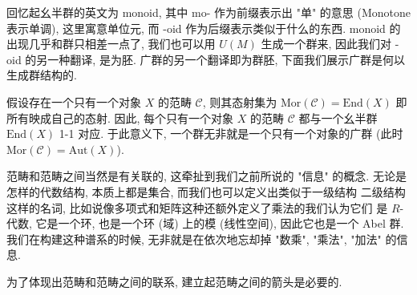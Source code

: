\documentclass[UTF8]{book}
\begin{document}
\begin{remark}
    回忆起幺半群的英文为 monoid, 其中 mo- 作为前缀表示出 "单" 的意思 
    (Monotone 表示单调), 
    这里寓意单位元, 而 -oid 作为后缀表示类似于什么的东西. 
    monoid 的出现几乎和群只相差一点了, 我们也可以用 $U(M)$ 
    生成一个群来, 因此我们对 -oid 的另一种翻译, 是为胚. 
    广群的另一个翻译即为群胚, 下面我们展示广群是何以生成群结构的. 

    假设存在一个只有一个对象 $X$ 的范畴 $\mathcal{C}$, 
    则其态射集为 $\mathrm{Mor}(\mathcal{C}) = \mathrm{End}(X)$ 
    即所有映成自己的态射. 
    因此, 每个只有一个对象 $X$ 的范畴 $\mathcal{C}$ 都与一个幺半群 
    $\mathrm{End}(X)$ 1-1 对应. 
    于此意义下, 一个群无非就是一个只有一个对象的广群 
    (此时 $\mathrm{Mor}(\mathcal{C}) = \mathrm{Aut}(X)$). 
\end{remark}

范畴和范畴之间当然是有关联的, 这牵扯到我们之前所说的 "信息" 的概念. 
无论是怎样的代数结构, 本质上都是集合, 而我们也可以定义出类似于一级结构
二级结构这样的名词, 比如说像多项式和矩阵这种还额外定义了乘法的我们认为它们
是 $R$-代数, 它是一个环, 也是一个环 (域) 上的模 (线性空间), 
因此它也是一个 Abel 群. 我们在构建这种谱系的时候, 
无非就是在依次地忘却掉 "数乘", "乘法", "加法" 的信息. 

为了体现出范畴和范畴之间的联系, 建立起范畴之间的箭头是必要的. 
\end{document}
